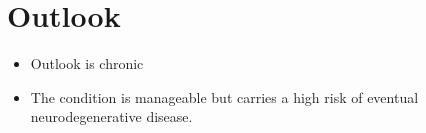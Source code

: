 \section{Outlook}
\begin{itemize}[noitemsep]
  \item Outlook is chronic
  \item The condition is manageable but carries a high risk of eventual neurodegenerative disease.
\end{itemize}
